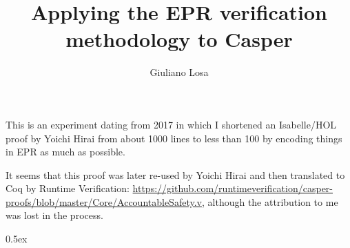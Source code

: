 \documentclass[11pt,a4paper]{article}
\begin{document}
\title{Applying the EPR verification methodology to Casper}
\author{Giuliano Losa}
\maketitle

\tableofcontents

This is an experiment dating from 2017 in which I shortened an Isabelle/HOL proof by Yoichi Hirai from about 1000 lines to less than 100 by encoding things in EPR as much as possible.

It seems that this proof was later re-used by Yoichi Hirai and then translated to Coq by Runtime Verification: \url{https://github.com/runtimeverification/casper-proofs/blob/master/Core/AccountableSafety.v}, although the attribution to me was lost in the process.

\parindent 0pt\parskip 0.5ex

\newpage



%
%
\end{document}
